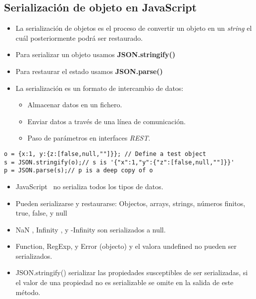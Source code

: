 \documentclass[4paper]{article}
\newcommand{\J}{JavaScript}
\begin{document}
\newpage
\subsection{Serialización de objeto en \J}
\begin{itemize}
\item La serialización de objetos es el proceso de convertir un objeto en un \emph{string} el cuál posteriormente podrá ser restaurado.
\item Para serializar un objeto usamos \textbf{JSON.stringify()}
\item Para restaurar el estado usamos \textbf{JSON.parse()}
\item La serialización es un formato de intercambio de datos:
\begin{itemize}
\item Almacenar datos en un fichero.
\item Enviar datos a través de una línea de comunicación.
\item Paso de parámetros en interfaces \textit{REST}.
\end{itemize}
\end{itemize}
\begin{lstlisting}
o = {x:1, y:{z:[false,null,""]}}; // Define a test object
s = JSON.stringify(o);// s is '{"x":1,"y":{"z":[false,null,""]}}'
p = JSON.parse(s);// p is a deep copy of o
\end{lstlisting}
\begin{itemize}
\item  \J ~ no serializa todos los tipos de datos.
\item Pueden serializarse y restaurarse: Objectos, arrays, strings, números finitos, true, false, y null
\item NaN , Infinity , y -Infinity son serializados a null.
\item Function, RegExp, y Error (objecto) y el valora undefined no pueden ser serializados.
\item JSON.stringify() serializar las propiedades susceptibles de ser serializadas, si el valor de una propiedad no es serializable se omite en la salida de este método.
\end{itemize}

\newpage
\end{document}
